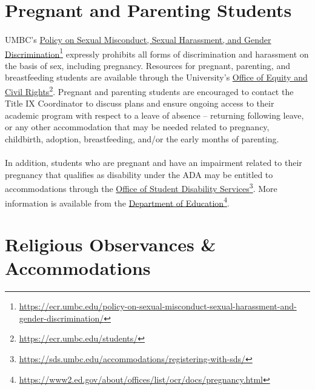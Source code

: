 \documentclass[letter,10pt]{article}
\begin{document}
\section*{Pregnant and Parenting Students}
\paragraph{}UMBC’s \href{https://ecr.umbc.edu/policy-on-sexual-misconduct-sexual-harassment-and-gender-discrimination/}{Policy on Sexual Misconduct, Sexual Harassment, and Gender Discrimination}\footnote{\url{https://ecr.umbc.edu/policy-on-sexual-misconduct-sexual-harassment-and-gender-discrimination/}} expressly prohibits all forms of discrimination and harassment on the basis of sex, including pregnancy. Resources for pregnant, parenting, and breastfeeding students are available through the University’s \href{https://ecr.umbc.edu/students/}{Office of Equity and Civil Rights}\footnote{\url{https://ecr.umbc.edu/students/}}. Pregnant and parenting students are encouraged to contact the Title IX Coordinator to discuss plans and ensure ongoing access to their academic program with respect to a leave of absence – returning following leave, or any other accommodation that may be needed related to pregnancy, childbirth, adoption, breastfeeding, and/or the early months of parenting.

\paragraph{}In addition, students who are pregnant and have an impairment related to their pregnancy that qualifies as disability under the ADA may be entitled to accommodations through the \href{https://sds.umbc.edu/accommodations/registering-with-sds/}{Office of Student Disability Services}\footnote{\url{https://sds.umbc.edu/accommodations/registering-with-sds/}}. More information is available from the \href{https://www2.ed.gov/about/offices/list/ocr/docs/pregnancy.html}{Department of Education}\footnote{\url{https://www2.ed.gov/about/offices/list/ocr/docs/pregnancy.html}}.

\section*{Religious Observances \& Accommodations}
\end{document}

